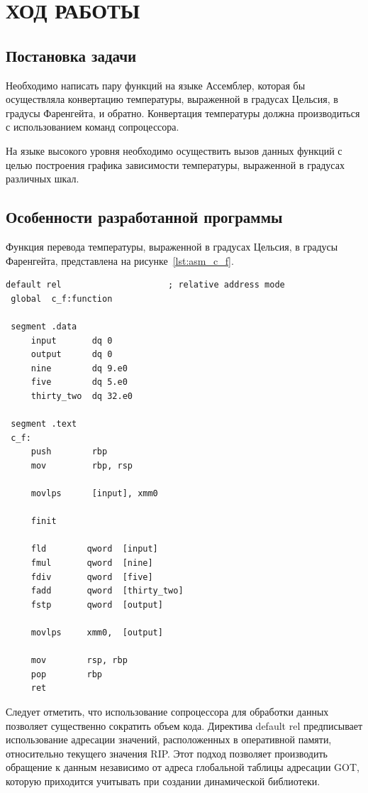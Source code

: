\section{ХОД РАБОТЫ}

\subsection{Постановка задачи}

Необходимо написать пару функций на языке Ассемблер,
которая бы осуществляла конвертацию температуры, выраженной в градусах 
Цельсия, в градусы Фаренгейта, и обратно.
Конвертация температуры должна производиться с использованием команд сопроцессора.

На языке высокого уровня необходимо осуществить вызов данных функций с
целью построения графика зависимости температуры, выраженной в градусах
различных шкал.

\subsection{Особенности разработанной программы}

Функция перевода температуры, выраженной в градусах Цельсия, в градусы Фаренгейта,
представлена на рисунке~\ref{lst:asm_c_f}.

\begin{lstlisting}[caption=Функция перевода температуры,
label=lst:asm_c_f,language={[x86masm]Assembler},basicstyle=\scriptsize\ttfamily]
 default rel                     ; relative address mode
 global  c_f:function
     
 segment .data
     input       dq 0
     output      dq 0
     nine        dq 9.e0
     five        dq 5.e0
     thirty_two  dq 32.e0
 
 segment .text
 c_f:
     push        rbp
     mov         rbp, rsp
 
     movlps      [input], xmm0
     
     finit
 
     fld        qword  [input]
     fmul       qword  [nine]
     fdiv       qword  [five]
     fadd       qword  [thirty_two]
     fstp       qword  [output]
                        
     movlps     xmm0,  [output]
     
     mov        rsp, rbp
     pop        rbp
     ret
\end{lstlisting}

Следует отметить, что использование сопроцессора для обработки данных 
позволяет существенно сократить объем кода. Директива default rel предписывает
использование адресации значений, расположенных в оперативной памяти,
относительно текущего значения RIP. Этот подход позволяет производить обращение
к данным независимо от адреса глобальной таблицы адресации GOT, которую приходится
учитывать при создании динамической библиотеки.

